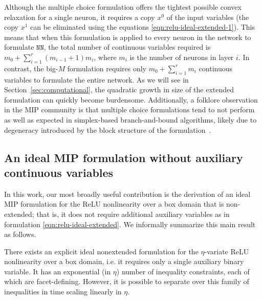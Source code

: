 \documentclass[smallextended]{svjour3}
\newcommand{\blue}[1]{{#1}}
\newcommand{\NN}{\texttt{NN}}
\begin{document}
Although the multiple choice formulation offers the tightest possible convex relaxation for a single neuron, it requires a copy $x^0$ of the input variables (the copy $x^1$ can be eliminated using the equations \eqref{eqn:relu-ideal-extended-1}). This means that when this formulation is applied to every neuron in the network to formulate $\NN{}$, the total number of continuous variables required is $m_0 + \sum_{i=1}^{r} (m_{i-1}+1)m_{i}$, where $m_i$ is the number of neurons in layer $i$. In contrast, the big-$M$ formulation requires only $m_0 + \sum_{i=1}^r m_i$ continuous variables to formulate the entire network. As we will see in Section~\ref{sec:computational}, the quadratic growth in size of the extended formulation can quickly become burdensome. Additionally, a folklore observation in the MIP community is that multiple choice formulations tend to not perform as well as expected in simplex-based branch-and-bound algorithms, likely due to degeneracy introduced by the block structure of the formulation~\cite{Vielma:2018}.

\subsection{An ideal MIP formulation without auxiliary continuous variables} \label{ssec:ideal-relu}

In this work, our most broadly useful contribution is the derivation of an ideal MIP formulation for the ReLU nonlinearity over a box domain that is non-extended; that is, it does not require additional auxiliary variables as in formulation \eqref{eqn:relu-ideal-extended}. We informally summarize this main result as follows.


\medskip
\begin{theo*} \label{thm:informal}
    There exists an explicit ideal nonextended formulation for the  \blue{$\eta$-variate} ReLU nonlinearity over a box domain, i.e. it requires only a single auxiliary binary variable. It has an exponential (in $\eta$) number of inequality constraints, each of which are facet-defining. However, it is possible to separate over this family of inequalities in time scaling linearly in $\eta$.
\end{theo*}
\medskip
\end{document}
